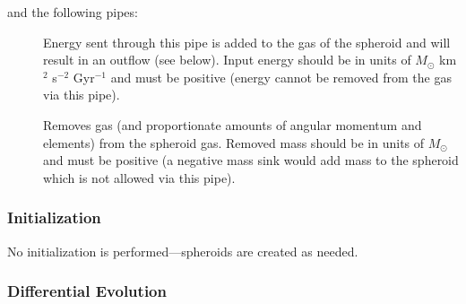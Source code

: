 and the following pipes:
\begin{description}
 \item [] Energy sent through this pipe is added to the gas of the spheroid and will result in an outflow (see below). Input energy should be in units of $M_\odot$ km$^2$ s$^{-2}$ Gyr$^{-1}$ and must be positive (energy cannot be removed from the gas via this pipe).
 \item [] Removes gas (and proportionate amounts of angular momentum and elements) from the spheroid gas. Removed mass should be in units of $M_\odot$ and must be positive (a negative mass sink would add mass to the spheroid which is not allowed via this pipe).
\end{description}

\subsubsection{Initialization}

No initialization is performed---spheroids are created as needed.

\subsubsection{Differential Evolution}

